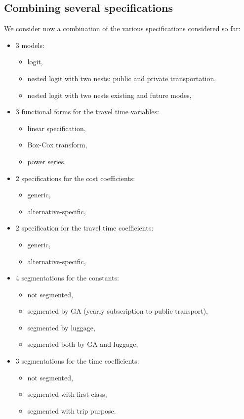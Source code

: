 \documentclass[12pt,a4paper]{article}
\begin{document}
\subsection{Combining several specifications}

We consider now a combination of the various specifications considered so far:
\begin{itemize}
\item  3 models:
  \begin{itemize}
    \item logit,
    \item  nested logit with two nests: public and private transportation,
    \item  nested logit with two nests existing and future modes,
  \end{itemize}
\item 3 functional forms for the travel time variables:
  \begin{itemize}
    \item linear specification,
    \item  Box-Cox transform,
    \item power series,
  \end{itemize}
\item 2 specifications for the cost coefficients:
  \begin{itemize}
    \item generic,
    \item  alternative-specific,
  \end{itemize}
\item  2 specification for the travel time coefficients:
  \begin{itemize}
    \item generic,
    \item alternative-specific,
  \end{itemize}
\item 4 segmentations for the constants:
  \begin{itemize}
    \item not segmented,
    \item  segmented by GA (yearly subscription to public transport),
    \item segmented by luggage,
    \item segmented both by GA and luggage,
  \end{itemize}
\item  3 segmentations for the time coefficients:
  \begin{itemize}
    \item not segmented,
    \item segmented with first class,
    \item segmented with trip purpose.
  \end{itemize}
\end{itemize}
\end{document}
